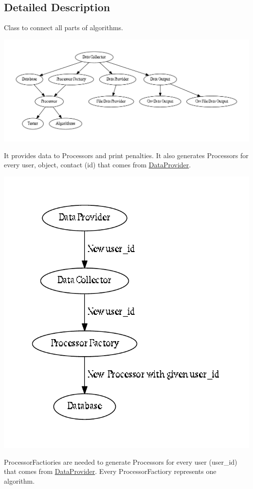 \subsection{Detailed Description}
Class to connect all parts of algorithms. \begin{center}

\begin{DoxyImageNoCaption}
  \mbox{\includegraphics[width=\textwidth,height=\textheight/2,keepaspectratio=true]{dot_inline_dotgraph_1}}
\end{DoxyImageNoCaption}
\end{center}
 It provides data to Processors and print penalties. It also generates Processors for every user, object, contact (id) that comes from \hyperlink{classBase_1_1DataProvider}{Data\-Provider}. \begin{center}

\begin{DoxyImageNoCaption}
  \mbox{\includegraphics[width=\textwidth,height=\textheight/2,keepaspectratio=true]{dot_inline_dotgraph_2}}
\end{DoxyImageNoCaption}
\end{center}
 Processor\-Factiories are needed to generate Processors for every user (user\-\_\-id) that comes from \hyperlink{classBase_1_1DataProvider}{Data\-Provider}. Every Processor\-Factiory represents one algorithm. 

